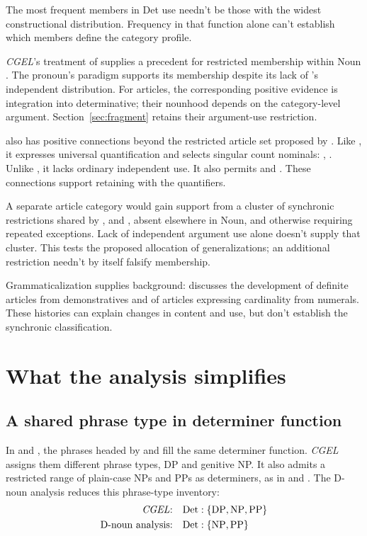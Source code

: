 \documentclass[12pt]{article}
\begin{document}
The most frequent members in Det use needn't be those with the widest constructional distribution. Frequency in that function alone can't establish which members define the category profile.

\textit{CGEL}'s treatment of  supplies a precedent for restricted membership within Noun \citep[470--471]{huddleston2002}. The pronoun's paradigm supports its membership despite its lack of 's independent distribution. For articles, the corresponding positive evidence is integration into determinative; their nounhood depends on the category-level argument. Section~\ref{sec:fragment} retains their argument-use restriction.

 also has positive connections beyond the restricted article set proposed by \textcite{spinillo2004reconceptualising}. Like , it expresses universal quantification and selects singular count nominals: , . Unlike , it lacks ordinary independent use. It also permits  and . These connections support retaining  with the quantifiers.

A separate article category would gain support from a cluster of synchronic restrictions shared by ,  and , absent elsewhere in Noun, and otherwise requiring repeated exceptions. Lack of independent argument use alone doesn't supply that cluster. This tests the proposed allocation of generalizations; an additional restriction needn't by itself falsify membership.

Grammaticalization supplies background: \textcite[331--336]{lyons1999} discusses the development of definite articles from demonstratives and of articles expressing cardinality from numerals. These histories can explain changes in content and use, but don't establish the synchronic classification.

\section{What the analysis simplifies}\label{sec:economy}

\subsection{A shared phrase type in determiner function}\label{sec:det-uniform}

In  and , the phrases headed by  and  fill the same determiner function. \textit{CGEL} assigns them different phrase types, DP and genitive NP. It also admits a restricted range of plain-case NPs and PPs as determiners, as in  and  \citep[Ch.~5, §4]{huddleston2002}. The D-noun analysis reduces this phrase-type inventory:
\[
\begin{aligned}
\text{\textit{CGEL}:} &\quad \mathrm{Det}:\{\mathrm{DP},\mathrm{NP},\mathrm{PP}\} \\
\text{D-noun analysis:} &\quad \mathrm{Det}:\{\mathrm{NP},\mathrm{PP}\}
\end{aligned}
\]
\end{document}
